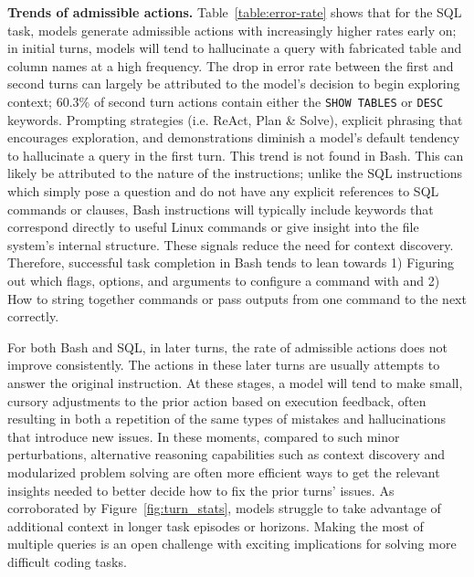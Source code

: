 

\textbf{Trends of admissible actions.}
Table~\ref{table:error-rate} shows that for the SQL task, models generate admissible actions with increasingly higher rates early on; in initial turns, models will tend to hallucinate a query with fabricated table and column names at a high frequency. The drop in error rate between the first and second turns can largely be attributed to the model's decision to begin exploring context; $60.3\%$ of second turn actions contain either the \texttt{SHOW TABLES} or \texttt{DESC} keywords. Prompting strategies (i.e. ReAct, Plan \& Solve), explicit phrasing that encourages exploration, and demonstrations diminish a model's default tendency to hallucinate a query in the first turn. This trend is not found in Bash. This can likely be attributed to the nature of the instructions; unlike the SQL instructions which simply pose a question and do not have any explicit references to SQL commands or clauses, Bash instructions will typically include keywords that correspond directly to useful Linux commands or give insight into the file system's internal structure. These signals reduce the need for context discovery. Therefore, successful task completion in Bash tends to lean towards 1) Figuring out which flags, options, and arguments to configure a command with and 2) How to string together commands or pass outputs from one command to the next correctly.

For both Bash and SQL, in later turns, the rate of admissible actions does not improve consistently. The actions in these later turns are usually attempts to answer the original instruction.
At these stages, a model will tend to make small, cursory adjustments to the prior action based on execution feedback, often resulting in both a repetition of the same types of mistakes and hallucinations that introduce new issues.
In these moments, compared to such minor perturbations, alternative reasoning capabilities such as context discovery and modularized problem solving are often more efficient ways to get the relevant insights needed to better decide how to fix the prior turns' issues.
As corroborated by Figure~\ref{fig:turn_stats}, models struggle to take advantage of additional context in longer task episodes or horizons.
Making the most of multiple queries is an open challenge with exciting implications for solving more difficult coding tasks.



